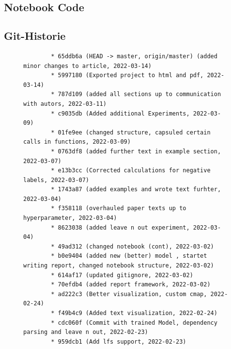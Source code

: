 \documentclass[DIV=13,fontsize=11pt]{scrartcl}
\begin{document}
\subsection{Notebook Code}



\subsection{Git-Historie}
\begin{figure}[H]
    \tiny
    \begin{lstlisting}
        * 65ddb6a (HEAD -> master, origin/master) (added minor changes to article, 2022-03-14)
        * 5997180 (Exported project to html and pdf, 2022-03-14)
        * 787d109 (added all sections up to communication with autors, 2022-03-11)
        * c9035db (Added additional Experiments, 2022-03-09)
        * 01fe9ee (changed structure, capsuled certain calls in functions, 2022-03-09)
        * 0763df8 (added further text in example section, 2022-03-07)
        * e13b3cc (Corrected calculations for negative labels, 2022-03-07)
        * 1743a87 (added examples and wrote text furhter, 2022-03-04)
        * f358118 (overhauled paper texts up to hyperparameter, 2022-03-04)
        * 8623038 (added leave n out experiment, 2022-03-04)
        * 49ad312 (changed notebook (cont), 2022-03-02)
        * b0e9404 (added new (better) model , startet writing report, changed notebook structure, 2022-03-02)
        * 614af17 (updated gitignore, 2022-03-02)
        * 70efdb4 (added report framework, 2022-03-02)
        * ad222c3 (Better visualization, custom cmap, 2022-02-24)
        * f49b4c9 (Added text visualization, 2022-02-24)
        * cdc060f (Commit with trained Model, dependency parsing and leave n out, 2022-02-23)
        * 959dcb1 (Add lfs support, 2022-02-23)                
    \end{lstlisting}
\end{figure}
\printbibliography
\end{document}
